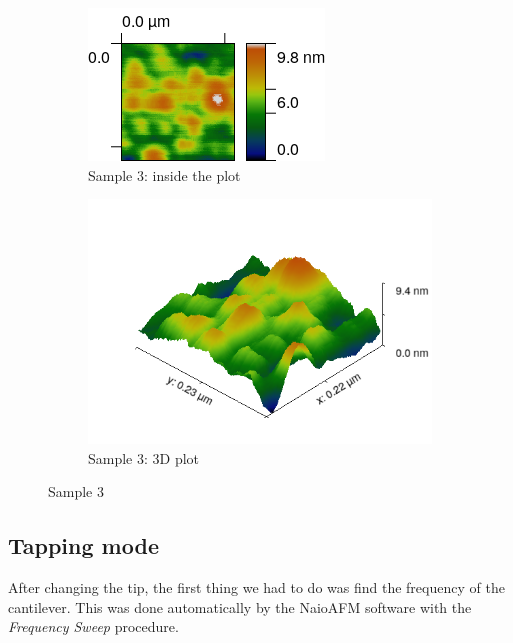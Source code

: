 \documentclass[11pt,a4paper]{article}
\begin{document}
\begin{figure}[H]
\centering
\begin{subfigure}[b]{0.45\textwidth}
\includegraphics[width=\textwidth]{sm_sample3}
\caption{Sample 3: inside the plot}
\end{subfigure}
\begin{subfigure}[b]{0.45\textwidth}
\includegraphics[width=\textwidth]{sm_sample3_3D_improved}
\caption{Sample 3: 3D plot}
\end{subfigure}
\caption{Sample 3}
\label{fig:sample3_light_green}
\end{figure}

\newpage
\subsection{Tapping mode}
After changing the tip, the first thing we had to do was find the frequency of the cantilever. This was done automatically by the NaioAFM software with the \emph{Frequency Sweep} procedure.
\end{document}

